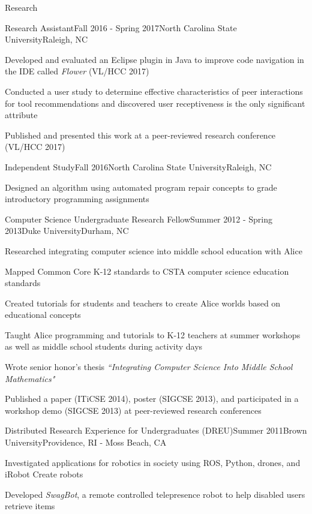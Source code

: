 \documentclass{resume} %
\begin{document}
\begin{rSection}{Research}
\begin{rSubsection}{Research Assistant}{Fall 2016 - Spring 2017}{North Carolina State University}{Raleigh, NC}
\item Developed and evaluated an Eclipse plugin in Java to improve code navigation in the IDE called \textit{Flower} (VL/HCC 2017)
\item Conducted a user study to determine effective characteristics of peer interactions for tool recommendations and discovered user receptiveness is the only significant attribute
\item Published and presented this work at a peer-reviewed research conference (VL/HCC 2017)
\end{rSubsection}
\vspace{-5pt}

\begin{rSubsection}{Independent Study}{Fall 2016}{North Carolina State University}{Raleigh, NC}
\item Designed an algorithm using automated program repair concepts to grade introductory programming assignments
\end{rSubsection}
\vspace{-5pt}

\begin{rSubsection}{Computer Science Undergraduate Research Fellow}{Summer 2012 - Spring 2013}{Duke University}{Durham, NC}
\item Researched integrating computer science into middle school education with Alice
\item Mapped Common Core K-12 standards to CSTA computer science education standards
\item Created tutorials for students and teachers to create Alice worlds based on educational concepts
\item Taught Alice programming and tutorials to K-12 teachers at summer workshops as well as middle school students during activity days
\item Wrote senior honor's thesis \textit{``Integrating Computer Science Into Middle School Mathematics"} 
\item Published a paper (ITiCSE 2014), poster (SIGCSE 2013), and participated in a workshop demo (SIGCSE 2013) at peer-reviewed research conferences
\end{rSubsection}
\vspace{-5pt}

\begin{rSubsection}{Distributed Research Experience for Undergraduates (DREU)}{Summer 2011}{Brown University}{Providence, RI - Moss Beach, CA}
\item Investigated applications for robotics in society using ROS, Python, drones, and iRobot Create robots
\item Developed \textsl{SwagBot}, a remote controlled telepresence robot to help disabled users retrieve items
\end{rSubsection}

\end{rSection}
\end{document}
